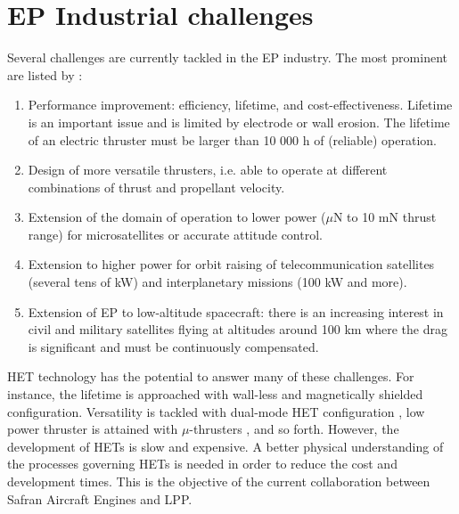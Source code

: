 
\section{EP Industrial challenges}
\label{sec-challenges}

Several challenges are currently tackled in the \ac{EP} industry.
The most prominent are listed by \citet{samukawa2012}\string:
\begin{enumerate}
  \item Performance improvement\string: efficiency, lifetime, and cost-effectiveness.
   Lifetime is an important issue and is limited by electrode or wall erosion.
   The lifetime of an electric thruster must be larger than 10 000 h of (reliable) operation.
   \item  Design of more versatile thrusters, i.e. able to operate at different combinations of thrust and propellant velocity.
   \item  Extension of the domain of operation to lower power ($\mu$N to 10 mN thrust range) for microsatellites or accurate attitude control.
   \item  Extension to higher power for orbit raising of telecommunication satellites (several tens of kW) and    interplanetary missions (100 kW and more).
   \item Extension of EP to low-altitude spacecraft\string: there is an increasing interest in civil and military satellites flying  at altitudes around 100 km where the drag is significant and must be continuously compensated.
\end{enumerate}

\ac{HET} technology has the potential to answer many of these challenges.
For instance, the lifetime is approached with wall-less and magnetically shielded configuration.
Versatility is tackled with dual-mode \ac{HET} configuration \citep{boniface2017}, low power thruster is attained with $\mu$-thrusters \citep{lascombes2018}, and so forth.
However, the development of \ac{HET}s is slow and expensive. 
A better physical understanding of the processes governing \ac{HET}s is needed in order to reduce the cost and development times.
This is the objective of the current collaboration between Safran Aircraft Engines and \ac{LPP}.
